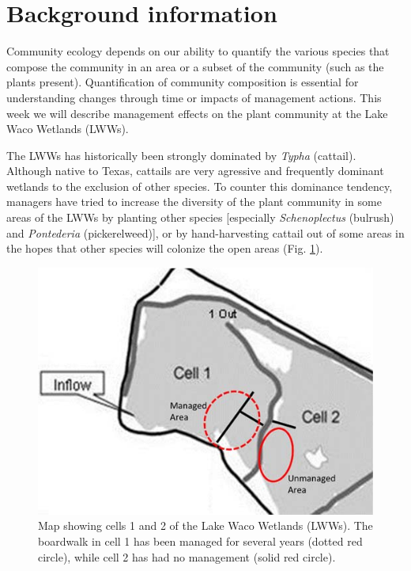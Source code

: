 \documentclass[]{book}
\begin{document}
\hypertarget{background-information-2}{%
\section{Background information}\label{background-information-2}}

Community ecology depends on our ability to quantify the various species that compose the community in an area or a subset of the community (such as the plants present). Quantification of community composition is essential for understanding changes through time or impacts of management actions. This week we will describe management effects on the plant community at the Lake Waco Wetlands (LWWs).

The LWWs has historically been strongly dominated by \emph{Typha} (cattail). Although native to Texas, cattails are very agressive and frequently dominant wetlands to the exclusion of other species. To counter this dominance tendency, managers have tried to increase the diversity of the plant community in some areas of the LWWs by planting other species {[}especially \emph{Schenoplectus} (bulrush) and \emph{Pontederia} (pickerelweed){]}, or by hand-harvesting cattail out of some areas in the hopes that other species will colonize the open areas (Fig. \ref{fig:restoration-fig}).

\begin{figure}
\centering
\includegraphics{chapter_materials/restoration_ecology/lww_management.jpg}
\caption{\label{fig:restoration-fig}Map showing cells 1 and 2 of the Lake Waco Wetlands (LWWs). The boardwalk in cell 1 has been managed for several years (dotted red circle), while cell 2 has had no management (solid red circle).}
\end{figure}
\end{document}

